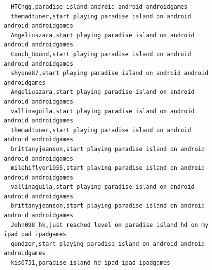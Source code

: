 \begin{figure}[htpb]
\begin{verbatim}
  HTChgg,paradise island android android androidgames
  themadtuner,start playing paradise island on android android androidgames
  Angeliuszara,start playing paradise island on android android androidgames
  Couch_Bound,start playing paradise island on android android androidgames
  shyone87,start playing paradise island on android android androidgames
  Angeliuszara,start playing paradise island on android android androidgames
  vallinaguila,start playing paradise island on android android androidgames
  themadtuner,start playing paradise island on android android androidgames
  brittanyjeanson,start playing paradise island on android android androidgames
  milehiflyer1955,start playing paradise island on android android androidgames
  vallinaguila,start playing paradise island on android android androidgames
  brittanyjeanson,start playing paradise island on android android androidgames
  John098_hk,just reached level on paradise island hd on my ipad pad ipadgames
  gundzer,start playing paradise island on android android androidgames
  kis0731,paradise island hd ipad ipad ipadgames


\end{verbatim}
\end{figure}
